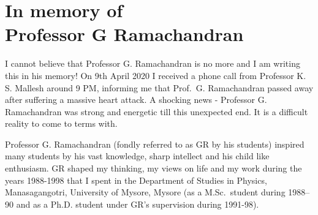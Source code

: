 \chapter[In memory of Professor G Ramachandran]{In memory of\\ Professor G Ramachandran}\label{chap28}


\renewcommand{\thefootnote}{\arabic{footnote}}

I cannot believe that Professor G. Ramachandran is no more and I am writing this in his memory! On 9th April 2020 I received a phone call from Professor K. S. Mallesh around 9 PM, informing me that Prof.\ G. Ramachandran passed away after suffering a massive heart attack. A shocking news - Professor G. Ramachandran was strong and energetic till this unexpected end. It is a difficult reality to come to terms with.
\vskip 2pt

Professor G. Ramachandran (fondly referred to as GR by his students) inspired many students by his vast knowledge, sharp intellect and his child like enthusiasm. GR shaped my thinking, my views on life and my work during the years 1988-1998 that I spent in the Department of Studies in Physics, Manasagangotri, University of Mysore, Mysore (as a M.Sc.\ student during 1988--90 and as a Ph.D. student under GR’s supervision during 1991-98).
\vskip 2pt

